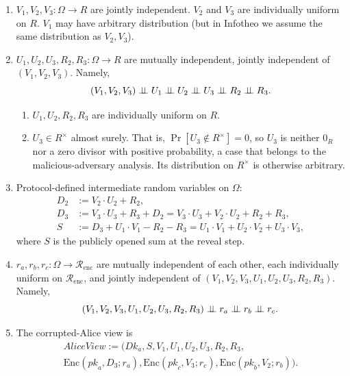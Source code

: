 \documentclass[11pt]{article}
\newcommand{\indep}{\mathrel{\perp\mkern-9mu\perp}}
\newcommand{\Renc}{\mathcal{R}_{\mathrm{enc}}}
\newcommand{\Encf}{\mathrm{Enc}}
\newcommand{\AliceView}{\mathit{AliceView}}
\newcommand{\Dk}{\mathit{Dk}}
\newcommand{\pk}{\mathit{pk}}
\begin{document}
\begin{enumerate}
\item $V_1, V_2, V_3 : \Omega \to R$ are jointly independent. $V_2$ and $V_3$ are individually uniform on $R$. $V_1$ may have arbitrary distribution (but in Infotheo we assume the same distribution as $V_2, V_3$).

\item $U_1, U_2, U_3, R_2, R_3 : \Omega \to R$ are mutually independent, jointly independent of $(V_1, V_2, V_3)$. Namely,
\[
(V_1, V_2, V_3) \indep U_1 \indep U_2 \indep U_3 \indep R_2 \indep R_3.
\]
  \begin{enumerate}[label=2.\arabic*.]
  \item $U_1, U_2, R_2, R_3$ are individually uniform on $R$.
  \item $U_3 \in R^\times$ almost surely. That is, $\Pr[U_3 \notin R^\times] = 0$, so $U_3$ is neither $0_R$ nor a zero divisor with positive probability, a case that belongs to the malicious-adversary analysis. Its distribution on $R^\times$ is otherwise arbitrary.
  \end{enumerate}

\item Protocol-defined intermediate random variables on $\Omega$:
\begin{align*}
D_2 &:= V_2 \cdot U_2 + R_2, \\
D_3 &:= V_3 \cdot U_3 + R_3 + D_2 = V_3 \cdot U_3 + V_2 \cdot U_2 + R_2 + R_3, \\
S   &:= D_3 + U_1 \cdot V_1 - R_2 - R_3 = U_1 \cdot V_1 + U_2 \cdot V_2 + U_3 \cdot V_3,
\end{align*}
where $S$ is the publicly opened sum at the reveal step.

\item $r_a, r_b, r_c : \Omega \to \Renc$ are mutually independent of each other, each individually uniform on $\Renc$, and jointly independent of $(V_1, V_2, V_3, U_1, U_2, U_3, R_2, R_3)$. Namely,
\[
(V_1, V_2, V_3, U_1, U_2, U_3, R_2, R_3) \indep r_a \indep r_b \indep r_c.
\]

\item The corrupted-Alice view is
\begin{multline*}
\AliceView := \big( \Dk_a, S, V_1, U_1, U_2, U_3, R_2, R_3, \\
\Encf(\pk_a, D_3; r_a), \Encf(\pk_c, V_3; r_c), \Encf(\pk_b, V_2; r_b) \big).
\end{multline*}
\end{enumerate}
\end{document}
